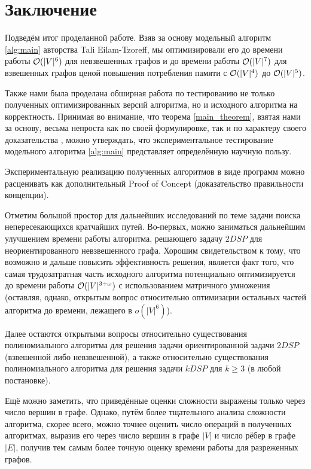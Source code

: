 \chapter{Заключение}

Подведём итог проделанной работе. Взяв за основу модельный алгоритм \ref{alg:main} авторства Tali Eilam-Tzoreff, мы оптимизировали его до времени работы $\mathcal{O}(|V|^6)$ для невзвешенных графов и до времени работы $\mathcal{O}(|V|^7)$ для взвешенных графов ценой повышения потребления памяти с $\mathcal{O}(|V|^4)$ до $\mathcal{O}(|V|^5)$. 

Также нами была проделана обширная работа по тестированию не только полученных оптимизированных версий алгоритма, но и исходного алгоритма на корректность. Принимая во внимание, что теорема \ref{main_theorem}, взятая нами за основу, весьма непроста как по своей формулировке, так и по характеру своего доказательства \cite{ET}, можно утверждать, что экспериментальное тестирование модельного алгоритма \ref{alg:main} представляет определённую научную пользу. 

Экспериментальную реализацию полученных алгоритмов в виде программ можно расценивать как дополнительный Proof of Concept (доказательство правильности концепции).

Отметим большой простор для дальнейших исследований по теме задачи поиска непересекающихся кратчайших путей. Во-первых, можно заниматься дальнейшим улучшением времени работы алгоритма, решающего задачу $2DSP$ для неориентированного невзвешенного графа. Хорошим свидетельством к тому, что возможно и дальше повысить эффективность решения, является факт того, что самая трудозатратная часть исходного алгоритма потенциально оптимизируется до времени работы $\mathcal{O}(|V|^{3 + \omega})$ с использованием матричного умножения (оставляя, однако, открытым вопрос относительно оптимизации остальных частей алгоритма до времени, лежащего в $o(|V|^6)$).

Далее остаются открытыми вопросы относительно существования полиномиального алгоритма для решения задачи ориентированной задачи $2DSP$ (взвешенной либо невзвешенной), а также относительно существования полиномиального алгоритма для решения задачи $kDSP$ для $k \geq 3$ (в любой постановке).

Ещё можно заметить, что приведённые оценки сложности выражены только через число вершин в графе. Однако, путём более тщательного анализа сложности алгоритма, скорее всего, можно точнее оценить число операций в полученных алгоритмах, выразив его через число вершин в графе $|V|$ и число рёбер в графе $|E|$, получив тем самым более точную оценку времени работы для разреженных графов.
